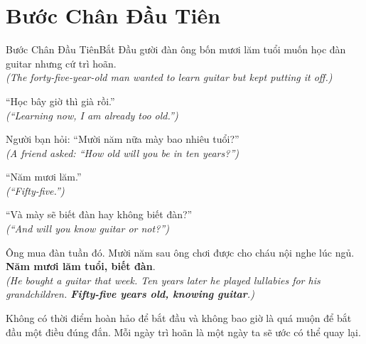 \section{Bước Chân Đầu Tiên}
\begin{truyen}{Bước Chân Đầu Tiên}{Bắt Đầu}
gười đàn ông bốn mươi lăm tuổi muốn học đàn guitar nhưng cứ trì hoãn.\\
\textit{(The forty-five-year-old man wanted to learn guitar but kept putting it off.)}

``Học bây giờ thì già rồi.''\\
\textit{(``Learning now, I am already too old.'')}

Người bạn hỏi: ``Mười năm nữa mày bao nhiêu tuổi?''\\
\textit{(A friend asked: ``How old will you be in ten years?'')}

``Năm mươi lăm.''\\
\textit{(``Fifty-five.'')}

``Và mày sẽ biết đàn hay không biết đàn?''\\
\textit{(``And will you know guitar or not?'')}

Ông mua đàn tuần đó. Mười năm sau ông chơi được cho cháu nội nghe lúc ngủ. \textbf{Năm mươi lăm tuổi, biết đàn}.\\
\textit{(He bought a guitar that week. Ten years later he played lullabies for his grandchildren. \textbf{Fifty-five years old, knowing guitar}.)}
\end{truyen}
\begin{baihoc}
  Không có thời điểm hoàn hảo để bắt đầu và không bao giờ là quá muộn để bắt đầu một điều đúng đắn. Mỗi ngày trì hoãn là một ngày ta sẽ ước có thể quay lại.
\end{baihoc}
